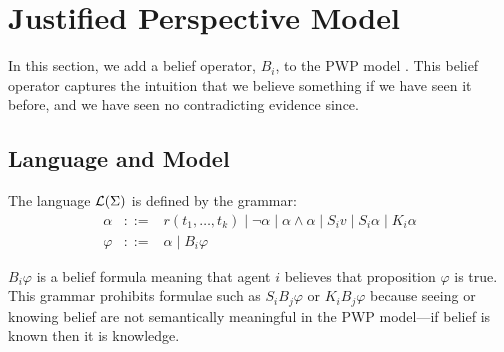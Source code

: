 


\section{Justified Perspective Model}

In this section, we add a belief operator, $B_i$, to the PWP model \cite{Hu2022-ul}. This belief operator captures the intuition that we believe  something if we have  seen it before, and we have seen no contradicting evidence since. 

\subsection{Language and Model}


\begin{definition}[Syntax]
\label{def:language}
The language $\mathcal{L}(\Sigma)$ is defined by the grammar:
\[
\begin{array}{lll}
\alpha &::=& r(t_1,\dots,t_k) \mid \neg \alpha \mid \alpha \land \alpha \mid S_i v \mid S_i \alpha \mid K_i \alpha\\
\varphi & ::= & \alpha \mid B_i \varphi
\end{array}
    \]
\end{definition}

$B_i \varphi$ is a belief formula meaning that agent $i$ believes that proposition $\varphi$ is true. 
This grammar prohibits formulae such as $S_i B_j \varphi$ or $K_i B_j \varphi$ because seeing or knowing belief are not semantically meaningful in the PWP model---if belief is known then it is knowledge.


